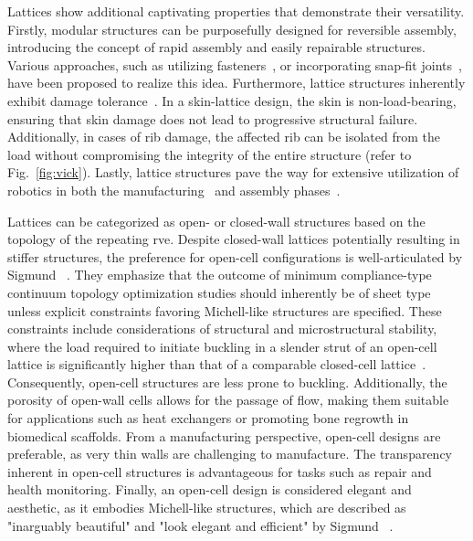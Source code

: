 Lattices show additional captivating properties that demonstrate their versatility. Firstly, modular structures can be purposefully designed for reversible assembly, introducing the concept of rapid assembly and easily repairable structures. Various approaches, such as utilizing fasteners~, or incorporating snap-fit joints~, have been proposed to realize this idea. Furthermore, lattice structures inherently exhibit damage tolerance~. In a skin-lattice design, the skin is non-load-bearing, ensuring that skin damage does not lead to progressive structural failure. Additionally, in cases of rib damage, the affected rib can be isolated from the load without compromising the integrity of the entire structure (refer to Fig.~\ref{fig:vick}). Lastly, lattice structures pave the way for extensive utilization of robotics in both the manufacturing~ and assembly phases~.

Lattices can be categorized as open- or closed-wall structures based on the topology of the repeating \gls{rve}. Despite closed-wall lattices potentially resulting in stiffer structures, the preference for open-cell configurations is well-articulated by Sigmund \etal~. They emphasize that the outcome of minimum compliance-type continuum topology optimization studies should inherently be of sheet type unless explicit constraints favoring Michell-like structures are specified. These constraints include considerations of structural and microstructural stability, where the load required to initiate buckling in a slender strut of an open-cell lattice is significantly higher than that of a comparable closed-cell lattice~. Consequently, open-cell structures are less prone to buckling. Additionally, the porosity of open-wall cells allows for the passage of flow, making them suitable for applications such as heat exchangers or promoting bone regrowth in biomedical scaffolds. From a manufacturing perspective, open-cell designs are preferable, as very thin walls are challenging to manufacture. The transparency inherent in open-cell structures is advantageous for tasks such as repair and health monitoring. Finally, an open-cell design is considered elegant and aesthetic, as it embodies Michell-like structures, which are described as "inarguably beautiful" and "look elegant and efficient" by Sigmund \etal~\cite{sigmund_non-optimality_2016}.


